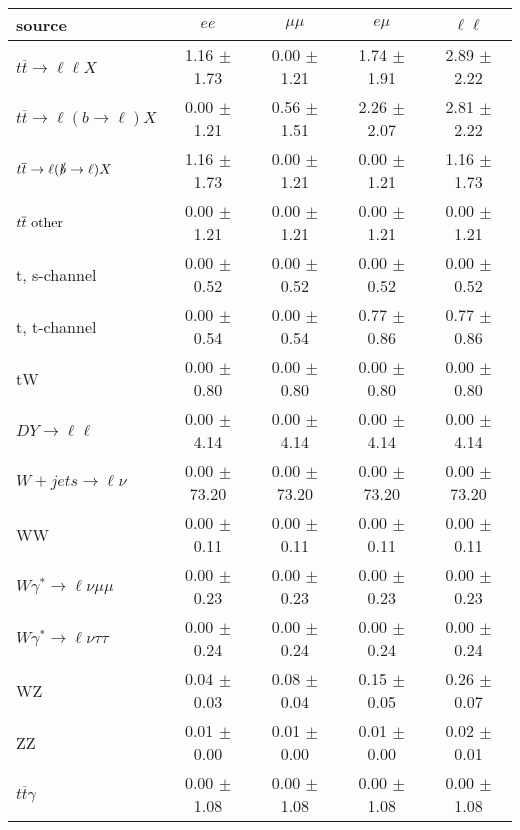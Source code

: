 \begin{tabular}{l|cccc} \hline\hline
source & $ee$ & $\mu\mu$ & $e\mu$ & $\ell\ell $ \\
\hline
$t\overline{t} \rightarrow \ell \ell X$ &  1.16 $\pm$  1.73 &  0.00 $\pm$  1.21 &  1.74 $\pm$  1.91 &  2.89 $\pm$  2.22 \\
$t\overline{t} \rightarrow \ell (b \rightarrow \ell) X$ &  0.00 $\pm$  1.21 &  0.56 $\pm$  1.51 &  2.26 $\pm$  2.07 &  2.81 $\pm$  2.22 \\
$t\overline{t} \rightarrow \ell (\slashed b \rightarrow \ell) X$ &  1.16 $\pm$  1.73 &  0.00 $\pm$  1.21 &  0.00 $\pm$  1.21 &  1.16 $\pm$  1.73 \\
        $t\overline{t}\ \rm{other}$ &  0.00 $\pm$  1.21 &  0.00 $\pm$  1.21 &  0.00 $\pm$  1.21 &  0.00 $\pm$  1.21 \\
\hline
                       t, s-channel &  0.00 $\pm$  0.52 &  0.00 $\pm$  0.52 &  0.00 $\pm$  0.52 &  0.00 $\pm$  0.52 \\
                       t, t-channel &  0.00 $\pm$  0.54 &  0.00 $\pm$  0.54 &  0.77 $\pm$  0.86 &  0.77 $\pm$  0.86 \\
                                 tW &  0.00 $\pm$  0.80 &  0.00 $\pm$  0.80 &  0.00 $\pm$  0.80 &  0.00 $\pm$  0.80 \\
\hline
         $DY \rightarrow \ell \ell$ &  0.00 $\pm$  4.14 &  0.00 $\pm$  4.14 &  0.00 $\pm$  4.14 &  0.00 $\pm$  4.14 \\
      $W+jets \rightarrow \ell \nu$ &  0.00 $\pm$ 73.20 &  0.00 $\pm$ 73.20 &  0.00 $\pm$ 73.20 &  0.00 $\pm$ 73.20 \\
                                 WW &  0.00 $\pm$  0.11 &  0.00 $\pm$  0.11 &  0.00 $\pm$  0.11 &  0.00 $\pm$  0.11 \\
\hline
$W\gamma^{*} \rightarrow \ell \nu \mu\mu$ &  0.00 $\pm$  0.23 &  0.00 $\pm$  0.23 &  0.00 $\pm$  0.23 &  0.00 $\pm$  0.23 \\
$W\gamma^{*} \rightarrow \ell \nu \tau\tau$ &  0.00 $\pm$  0.24 &  0.00 $\pm$  0.24 &  0.00 $\pm$  0.24 &  0.00 $\pm$  0.24 \\
                                 WZ &  0.04 $\pm$  0.03 &  0.08 $\pm$  0.04 &  0.15 $\pm$  0.05 &  0.26 $\pm$  0.07 \\
                                 ZZ &  0.01 $\pm$  0.00 &  0.01 $\pm$  0.00 &  0.01 $\pm$  0.00 &  0.02 $\pm$  0.01 \\
\hline
              $t\overline{t}\gamma$ &  0.00 $\pm$  1.08 &  0.00 $\pm$  1.08 &  0.00 $\pm$  1.08 &  0.00 $\pm$  1.08 \\

\end{tabular}
